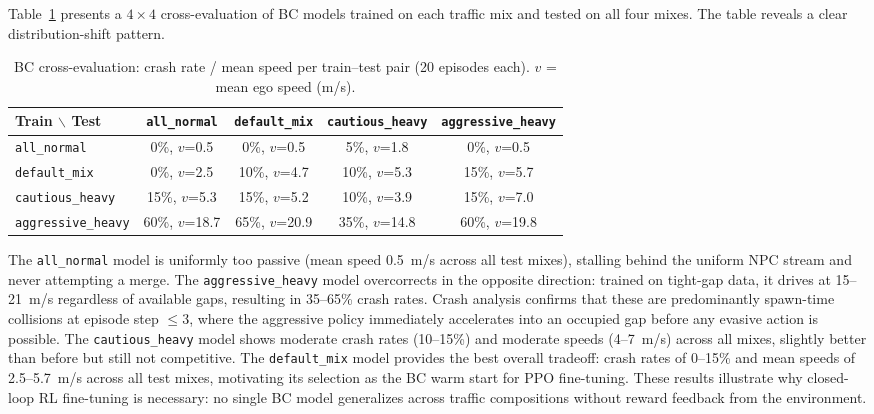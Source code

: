 \documentclass[conference]{IEEEtran}
\begin{document}
Table~\ref{tab:bc_cross} presents a $4 \times 4$ cross-evaluation of BC
models trained on each traffic mix and tested on all four mixes.
The table reveals a clear distribution-shift pattern.

\begin{table}[t]
  \caption{BC cross-evaluation: crash rate / mean speed per train--test
    pair (20 episodes each). $v$ = mean ego speed (m/s).}
  \label{tab:bc_cross}
  \centering
  \begin{tabular}{lcccc}
    \toprule
    Train $\backslash$ Test & \texttt{all\_normal} & \texttt{default\_mix} & \texttt{cautious\_heavy} & \texttt{aggressive\_heavy} \\
    \midrule
    \texttt{all\_normal}
      & 0\%, $v$=0.5  & 0\%, $v$=0.5  & 5\%, $v$=1.8  & 0\%, $v$=0.5 \\
    \texttt{default\_mix}
      & 0\%, $v$=2.5  & 10\%, $v$=4.7 & 10\%, $v$=5.3 & 15\%, $v$=5.7 \\
    \texttt{cautious\_heavy}
      & 15\%, $v$=5.3 & 15\%, $v$=5.2 & 10\%, $v$=3.9 & 15\%, $v$=7.0 \\
    \texttt{aggressive\_heavy}
      & 60\%, $v$=18.7 & 65\%, $v$=20.9 & 35\%, $v$=14.8 & 60\%, $v$=19.8 \\
    \bottomrule
  \end{tabular}
\end{table}

The \texttt{all\_normal} model is uniformly too passive (mean speed
0.5~m/s across all test mixes), stalling behind the uniform NPC stream
and never attempting a merge.
The \texttt{aggressive\_heavy} model overcorrects in the opposite direction:
trained on tight-gap data, it drives at 15--21~m/s regardless of
available gaps, resulting in 35--65\% crash rates.
Crash analysis confirms that these are predominantly spawn-time collisions
at episode step $\leq 3$, where the aggressive policy immediately
accelerates into an occupied gap before any evasive action is possible.
The \texttt{cautious\_heavy} model shows moderate crash rates (10--15\%)
and moderate speeds (4--7~m/s) across all mixes, slightly better than
before but still not competitive.
The \texttt{default\_mix} model provides the best overall tradeoff:
crash rates of 0--15\% and mean speeds of 2.5--5.7~m/s across all test mixes,
motivating its selection as the BC warm start for PPO fine-tuning.
These results illustrate why closed-loop RL fine-tuning is necessary: no
single BC model generalizes across traffic compositions without reward
feedback from the environment.
\end{document}
